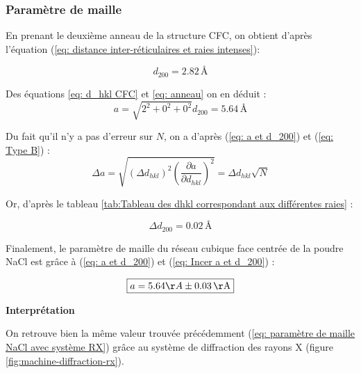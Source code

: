 \subsubsection{Paramètre de maille}



\vspace{0.2cm}
	En prenant le deuxième anneau de la structure CFC, on obtient d'après l'équation (\ref{eq:  distance inter-réticulaires et raies intenses}):
	
\begin{equation} \label{eq: anneau}
	d_{200} = 2.82 \, \text{\AA}
\end{equation}	

Des équations \eqref{eq: d_hkl CFC} et  \eqref{eq: anneau} on en déduit :
\begin{equation} \label{eq: a et d_200}
		 a = \sqrt{2^2 + 0^2 + 0^2} d_{200}  = 5.64\, \text{\AA}
\end{equation}


	
	Du fait qu'il n'y a pas d'erreur sur $N$, on a d'après (\ref{eq: a et d_200}) et (\ref{eq: Type B}) :
	\begin{equation}\label{eq: Incer a et d_200}
			 \Delta a =  \sqrt{\left ( \Delta d_{hkl} \right )^2 \left ( \frac{\partial a}{\partial d_{hkl}} \right )^2} =  \Delta d_{hkl}\sqrt{N}
	\end{equation}

	
Or,	d'après le tableau \ref{tab:Tableau des dhkl correspondant aux différentes raies} : 
	
	\begin{equation}
		\Delta d_{200} = 0.02 \, \text{\AA} 
	\end{equation} 
	
Finalement, le paramètre de maille du réseau cubique face centrée de la poudre NaCl est grâce à (\ref{eq: a et d_200}) et (\ref{eq: Incer a et d_200}) :

\begin{equation}
 \boxed{a = 5.64 \AA \pm 0.03 \, \text{\AA}}	
\end{equation} 

\begin{flushleft}
	\textbf{Interprétation} 
\end{flushleft}
On retrouve bien la même valeur trouvée précédemment (\ref{eq: paramètre de maille NaCl avec système RX}) grâce au système de diffraction des rayons X (figure \ref{fig:machine-diffraction-rx}).
